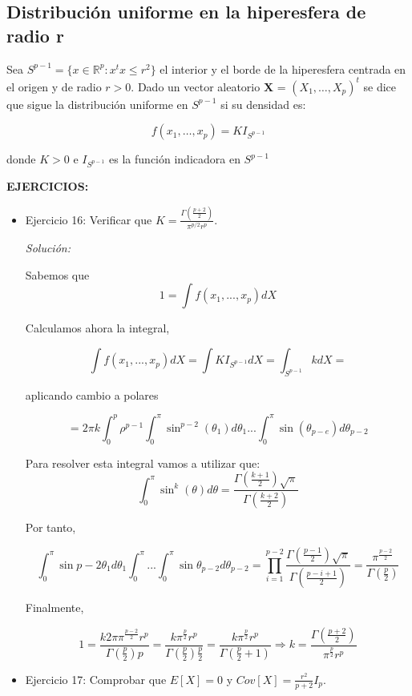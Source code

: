 \documentclass{article}
\theoremstyle{theorem-style}  %
\theoremstyle{definition}
\theoremstyle{example-style}
\begin{document}
	\subsection{Distribución uniforme en la hiperesfera de radio r}
	
	Sea $S^{p-1} = \{x \in \mathbb{R}^p: x^tx\leq r^2\}$ el interior y el borde de la hiperesfera centrada en el origen y de radio $r>0$. Dado un vector aleatorio \textbf{X} = $(X_1, \dots , X_p)^t$ se dice que sigue la distribución uniforme en $S^{p-1}$ si su densidad es:
	
	$$f(x_1, \dots, x_p)= KI_{S^{p-1}}$$
	
	donde $K>0$ e $I_{S^{p-1}}$ es la función indicadora en $ S^{p-1}$
	
	\textbf{EJERCICIOS:}
	\begin{itemize}
		\item Ejercicio 16: Verificar que $K = \frac{\Gamma(\frac{p+2}{2})}{\pi ^ {p/2} r^p}$.
		
		\textit{Solución:} 
		
		Sabemos que 
		\[
			 1 = \int f(x_1, ..., x_p) dX
		\]
		
		Calculamos ahora la integral,
		
		\[
			\int f(x_1, ..., x_p) dX = \int K I_{S^{p-1}} dX = \int_{S^{p-1}} k dX =
		\]
		
		aplicando cambio a polares 
		
		\[
			= 2 \pi k \int_0^p \rho^{p-1} \int_0^{\pi} \sin^{p-2}(\theta_1) d \theta_1 ... \int_0^{\pi} \sin(\theta_{p-e}) d \theta_{p-2}
		\]
		
		Para resolver esta integral vamos a utilizar que:
		\[
			\int_0^{\pi } \sin^k(\theta ) d\theta  = \frac{\Gamma(\frac{k+1}{2} )\sqrt{\pi} }{\Gamma(\frac{k+2}{2})}
		\]
		
		Por tanto, 
		
		\[
			\int_0^{\pi} \sin{p-2} \theta_1 d\theta_1 \int_0^{\pi} ... \int_{0}^{\pi} \sin\theta_{p-2} d\theta_{p-2} = 
			\prod_{i = 1}^{p-2} \frac{\Gamma(\frac{p-1}{2}) \sqrt{\pi}}{\Gamma(\frac{p-i+1}{2})} = \frac{\pi^{\frac{p-2}{2}}}{\Gamma(\frac{p}{2})}
		\]
		
		Finalmente,
		
		\[
			1 = \frac{k 2 \pi \pi^{\frac{p-2}{2}} r^p}{\Gamma(\frac{p}{2}) p} = \frac{k \pi^{\frac{p}{2}} r^p}{\Gamma(\frac{p}{2}) \frac{p}{2}} = \frac{k \pi^{\frac{p}{2}} r^p}{\Gamma(\frac{p}{2} +1)} \Rightarrow 
			k = \frac{\Gamma(\frac{p+2}{2})}{\pi^{\frac{p}{2}} r^p }
		\]
		
		
		\item Ejercicio 17: Comprobar que $E[X]=0$ y $Cov[X]=\frac{r^2}{p+2}I_p$.
		

\end{itemize}
\end{document}
